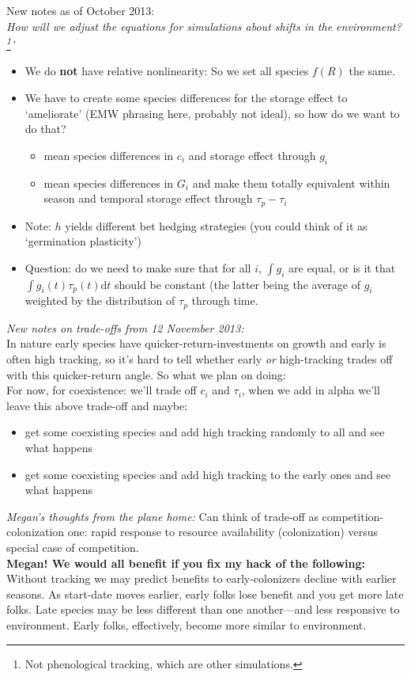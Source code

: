 \documentclass[11pt,a4paper,oneside]{article}
\begin{document}
\noindent New notes as of October 2013:\\
\emph{How will we adjust the equations for simulations about shifts in the environment?\footnote{Not phenological tracking, which are other simulations.}'}
\begin{itemize}
\item We do {\bf not} have relative nonlinearity: So we set all species \(f(R)\) the same. 
\item We have to create some species differences for the storage effect to `ameliorate' (EMW phrasing here, probably not ideal), so how do we want to do that?
\begin{itemize}
\item mean species differences in \(c_{i}\) and storage effect through \(g_{i}\) 
\item mean species differences in \(G_{i}\) and make them totally equivalent within season and temporal storage effect through \(\tau_{p}-\tau_{i}\) 
\end{itemize}
\item Note: \(h\) yields different bet hedging strategies (you could think of it as `germination plasticity')
\item Question: do we need to make sure that for all \(i\), \(\int g_{i}\) are equal, or is it that \(\int g_{i}(t)\tau_{p}(t)\mathrm{d}t\) should be constant (the latter being the average of \(g_{i}\) weighted by the distribution of \(\tau_{p}\) through time.
\end{itemize}

\noindent \emph{New notes on trade-offs from 12 November 2013:}\\
In nature early species have quicker-return-investments on growth and early is often high tracking, so it's hard to tell whether early \emph{or} high-tracking trades off with this quicker-return angle. So what we plan on doing:\\

For now, for coexistence: we'll trade off \(c_{i}\) and \(\tau_{i}\), when we add in alpha we'll leave this above trade-off and maybe:
\begin{itemize}
\item get some coexisting species and add high tracking randomly to all and see what happens
\item get some coexisting species and add high tracking to the early ones and see what happens
\end{itemize}

\noindent \emph{Megan's thoughts from the plane home:} Can think of trade-off as competition-colonization one: rapid response to resource availability (colonization) versus special case of competition.\\
{\bf Megan! We would all benefit if you fix my hack of the following:} Without tracking we may predict benefits to early-colonizers decline with earlier seasons. As start-date moves earlier, early folks lose benefit and you get more late folks. Late species may be less different than one another---and less responsive to environment. Early folks, effectively, become more similar to environment. 
\end{document}
